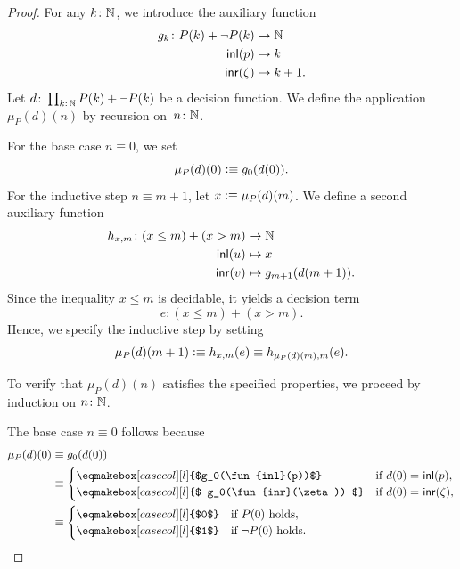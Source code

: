 \begin{proof}
    For any $k\colon\N$, we introduce the auxiliary function
    \begin{align*}
        g_k\colon P(k)+\neg P(k)&\to\N\\
        \fun{inl}(p)&\mapsto k\\
        \fun{inr}(\zeta)&\mapsto k+1.
    \end{align*}
    Let $d\colon\prod_{k\colon\N}P(k)+\neg P(k)$ be a decision function. We define the application $\mu_P(d)(n)$ by recursion on~$n\colon\N$. 
    
    For the base case $n\equiv0$, we set
    \[
        \mu_P(d)(0)\mathrel{\vcentcolon}\equiv g_0(d(0)).
    \]
    For the inductive step $n\equiv m+1$, let $x\mathrel{\vcentcolon}\equiv\mu_P(d)(m)$. We define a second auxiliary function
    \begin{align*}
        h_{x,m}\colon(x\le m)+(x>m)&\to\N\\
        \fun{inl}(u)&\mapsto x\\
        \fun{inr}(v)&\mapsto g_{m+1}(d(m+1)).
    \end{align*}
    Since the inequality $x\le m$ is decidable, it yields a decision term
    \[
        e\colon(x\le m)+(x>m).
    \]
    Hence, we specify the inductive step by setting
    \[
        \mu_P(d)(m+1)\mathrel{\vcentcolon}\equiv h_{x,m}(e)
            \equiv h_{\mu_P(d)(m),m}(e).
    \]
    
    To verify that $\mu_P(d)(n)$ satisfies the specified properties, we proceed by induction on $n\colon\N$. 
    
    The base case $n\equiv0$ follows because
    {\small
    \begin{align*}
        \mu_P(d)(0)
            &\equiv g_0(d(0))\\
            &\equiv\begin{cases}
                \eqmakebox[casecol][l]{$g_0(\fun{inl}(p))$}
                    &\text{if }
                        d(0)\eq{}\fun{inl}(p),\\
                \eqmakebox[casecol][l]{$
                    g_0(\fun{inr}(\zeta))
                $}
                    &\text{if }d(0)\eq{}\fun{inr}(\zeta),
            \end{cases}\\
            &\equiv\begin{cases}
                \eqmakebox[casecol][l]{$0$}
                    &\text{if }P(0)\text{ holds},\\
                \eqmakebox[casecol][l]{$1$}
                    &\text{if }\neg P(0)\text{ holds}.
            \end{cases}
    \end{align*}}
    

\end{proof}
